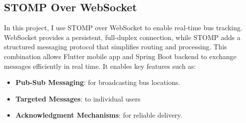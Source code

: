 \subsection{STOMP Over WebSocket}
\begin{minipage}{\textwidth}
    \setlength{\parindent}{2em} In this project, I use STOMP over WebSocket to enable real-time bus tracking. WebSocket provides a persistent, full-duplex connection, while STOMP adds a structured messaging protocol that simplifies routing and processing. This combination allows Flutter mobile app and Spring Boot backend to exchange messages efficiently in real time. It enables key features such as:
\end{minipage}
\begin{itemize}[itemsep=-0.1cm, topsep=0.25cm]
    \item \textbf{Pub-Sub Messaging}: for broadcasting bus locations.
    \item \textbf{Targeted Messages}: to individual users
    \item \textbf{Acknowledgment Mechanisms}: for reliable delivery.
\end{itemize}

